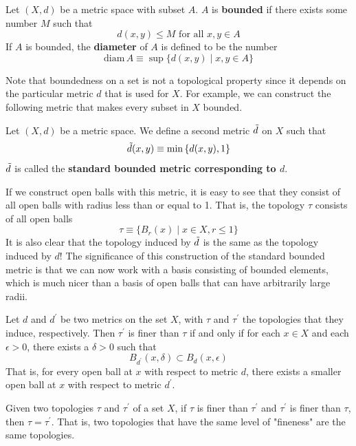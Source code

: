 \documentclass{article}
\begin{document}
    \begin{definition}
    Let $(X, d)$ be a metric space with subset $A$. $A$ is \textbf{bounded} if there exists some number $M$ such that
    \[d (x, y) \leq M \text{ for all } x,y \in A\]
    If $A$ is bounded, the \textbf{diameter} of $A$ is defined to be the number
    \[\text{diam}\, A \equiv \sup{\{d(x, y) \; | \; x, y \in A\}}\]
    \end{definition}

    Note that boundedness on a set is not a topological property since it depends on the particular metric $d$ that is used for $X$. For example, we can construct the following metric that makes every subset in $X$ bounded. 

    \begin{definition}
    Let $(X, d)$ be a metric space. We define a second metric $\Tilde{d}$ on $X$ such that
    \[\Tilde{d} (x, y) \equiv \min{\{d(x, y), 1\}}\]
    $\Tilde{d}$ is called the \textbf{standard bounded metric corresponding to $d$}. 
    \end{definition}

    If we construct open balls with this metric, it is easy to see that they consist of all open balls with radius less than or equal to 1. That is, the topology $\tau$ consists of all open balls
    \[\tau \equiv \{B_r (x) \; | \; x \in X, r \leq 1\}\]
    It is also clear that the topology induced by $\Tilde{d}$ is the same as the topology induced by $d$! The significance of this construction of the standard bounded metric is that we can now work with a basis consisting of bounded elements, which is much nicer than a basis of open balls that can have arbitrarily large radii.  

    \begin{lemma}
    Let $d$ and $d^\prime$ be two metrics on the set $X$, with $\tau$ and $\tau^\prime$ the topologies that they induce, respectively. Then $\tau^\prime$ is finer than $\tau$ if and only if for each $x \in X$ and each $\epsilon > 0$, there exists a $\delta > 0$ such that
    \[B_{d^\prime} (x, \delta) \subset B_d (x, \epsilon)\]
    That is, for every open ball at $x$ with respect to metric $d$, there exists a smaller open ball at $x$ with respect to metric $d^\prime$. 
    \end{lemma}

    \begin{corollary}
    Given two topologies $\tau$ and $\tau^\prime$ of a set $X$, if $\tau$ is finer than $\tau^\prime$ and $\tau^\prime$ is finer than $\tau$, then $\tau = \tau^\prime$. That is, two topologies that have the same level of "fineness" are the same topologies. 
    \end{corollary}
\end{document}
